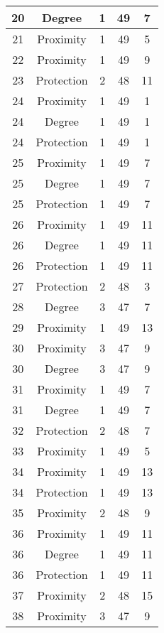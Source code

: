 \documentclass[results.tex]{subfiles}
\begin{document}
\begin{center}
\begin{tabular}{| c || c | c | c | c |}
    \hline
    20 & Degree & 1 & 49 & 7 \\ 
    \hline
    21 & Proximity & 1 & 49 & 5 \\ 
    \hline
    22 & Proximity & 1 & 49 & 9 \\ 
    \hline
    23 & Protection & 2 & 48 & 11 \\ 
    \hline
    24 & Proximity & 1 & 49 & 1 \\ 
    \hline
    24 & Degree & 1 & 49 & 1 \\ 
    \hline
    24 & Protection & 1 & 49 & 1 \\ 
    \hline
    25 & Proximity & 1 & 49 & 7 \\ 
    \hline
    25 & Degree & 1 & 49 & 7 \\ 
    \hline
    25 & Protection & 1 & 49 & 7 \\ 
    \hline
    26 & Proximity & 1 & 49 & 11 \\ 
    \hline
    26 & Degree & 1 & 49 & 11 \\ 
    \hline
    26 & Protection & 1 & 49 & 11 \\ 
    \hline
    27 & Protection & 2 & 48 & 3 \\ 
    \hline
    28 & Degree & 3 & 47 & 7 \\ 
    \hline
    29 & Proximity & 1 & 49 & 13 \\ 
    \hline
    30 & Proximity & 3 & 47 & 9 \\ 
    \hline
    30 & Degree & 3 & 47 & 9 \\ 
    \hline
    31 & Proximity & 1 & 49 & 7 \\ 
    \hline
    31 & Degree & 1 & 49 & 7 \\ 
    \hline
    32 & Protection & 2 & 48 & 7 \\ 
    \hline
    33 & Proximity & 1 & 49 & 5 \\ 
    \hline
    34 & Proximity & 1 & 49 & 13 \\ 
    \hline
    34 & Protection & 1 & 49 & 13 \\ 
    \hline
    35 & Proximity & 2 & 48 & 9 \\ 
    \hline
    36 & Proximity & 1 & 49 & 11 \\ 
    \hline
    36 & Degree & 1 & 49 & 11 \\ 
    \hline
    36 & Protection & 1 & 49 & 11 \\ 
    \hline
    37 & Proximity & 2 & 48 & 15 \\ 
    \hline
    38 & Proximity & 3 & 47 & 9 \\ 

\end{tabular}
\end{center}
\end{document}
